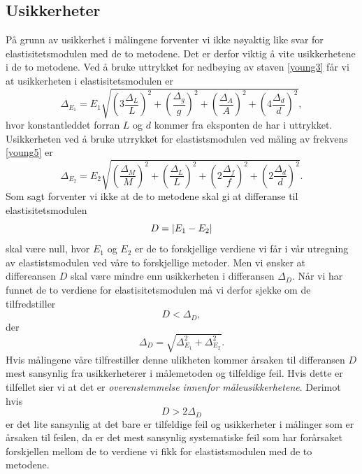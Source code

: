\documentclass[%
 reprint,
 amsmath,amssymb,
 aps,
 norsk,
 booktabs
]{revtex4-1}
\begin{document}
\subsection{Usikkerheter}
På grunn av usikkerhet i målingene forventer vi ikke nøyaktig like svar for elastisitetsmodulen med de to metodene. Det er derfor viktig å vite usikkerhetene i de to metodene. Ved å bruke uttrykket for nedbøying av staven \eqref{young3} får vi at usikkerheten i elastisitetsmodulen er
\begingroup\makeatletter\def\f@size{7.5}\check@mathfonts
\begin{equation}
  \Delta_{E_1} = E_1 \sqrt{\left(3\frac{\Delta_L}{L}\right)^2+\left(\frac{\Delta_g}{g}\right)^2+\left(\frac{\Delta_A}{A}\right)^2+\left(4\frac{\Delta_d}{d}\right)^2},\label{uncertenty1}
\end{equation}
\endgroup
hvor konstantleddet forran $L$ og $d$ kommer fra eksponten de har i uttrykket.
Usikkerheten ved å bruke utrrykket for elastistsmodulen ved måling av frekvens \eqref{young5} er
\begingroup\makeatletter\def\f@size{7.5}\check@mathfonts
\begin{equation}
  \Delta_{E_2} = E_2 \sqrt{\left(\frac{\Delta_M}{M}\right)^2+\left(\frac{\Delta_L}{L}\right)^2+\left(2\frac{\Delta_f}{f}\right)^2+\left(2\frac{\Delta_d}{d}\right)^2}. \label{uncertenty2}
\end{equation}
\endgroup
Som sagt forventer vi ikke at de to metodene skal gi at differanse til elastisitetsmodulen $$D=\abs{E_1-E_2}$$ skal være null, hvor $E_1$ og $E_2$ er de to forskjellige verdiene vi får i vår utregning av elastistsmodulen ved våre to forskjellige metoder. Men vi ønsker at differeansen $D$ skal være mindre enn usikkerheten i differansen $\Delta_D$. Når vi har funnet de to verdiene for elastisitetsmodulen må vi derfor sjekke om de tilfredstiller
\begin{equation}
  D < \Delta_D, \label{usikk1}
\end{equation}
der
\begin{equation}
  \Delta_D = \sqrt{\Delta_{E_1}^2 + \Delta_{E_2}^2}. \label{usikk2}
\end{equation}
Hvis målingene våre tilfrestiller denne ulikheten kommer årsaken til differansen $D$ mest sansynlig fra usikkerheterer i målemetoden og tilfeldige feil. Hvis dette er tilfellet sier vi at det er
\textit{overenstemmelse innenfor måleusikkerhetene}.
Derimot hvis
\begin{equation}
  D > 2\Delta_D
\end{equation}
er det lite sansynlig at det bare er tilfeldige feil og usikkerheter i målinger som er årsaken til feilen, da er det mest sansynlig systematiske feil som har forårsaket forskjellen mellom de to verdiene vi fikk for elastistsmodulen med de to metodene.
\end{document}
